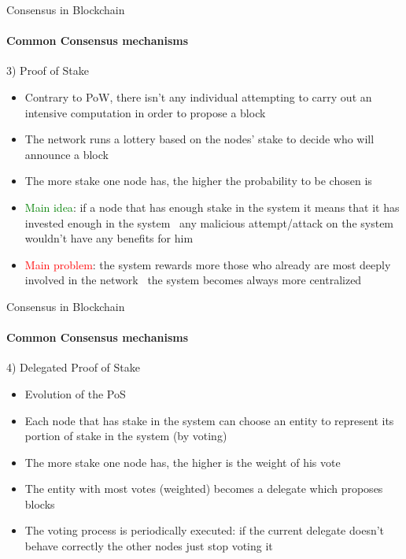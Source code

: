 \documentclass{beamer}
\newcommand\red[1]{\textcolor{red}{#1}}
\begin{document}
  \begin{frame}{Consensus in Blockchain}
    \framesubtitle{Common Consensus mechanisms}
    \begin{block}{3) Proof of Stake}
      \begin{itemize}
        \item Contrary to PoW, there isn't any individual attempting to carry out
        an intensive computation in order to propose a block 
        \item The network runs a lottery based on the nodes’ stake to decide
        who will announce a block 
        \item The more stake one node has, the higher the probability
        to be chosen is 
        \item \textcolor{green}{Main idea}: if a node that has enough stake in the system it means
        that it has invested enough in the system \MVRightarrow\, any malicious
        attempt/attack on the system wouldn't have any benefits for him \pause
        \item \red{Main problem}: the system rewards more those who already are most
        deeply involved in the network \MVRightarrow\, the system becomes always
        more centralized
      \end{itemize}
    \end{block}
  \end{frame}





  \begin{frame}{Consensus in Blockchain}
    \framesubtitle{Common Consensus mechanisms}
    \begin{block}{4) Delegated Proof of Stake}
      \begin{itemize}
        \item Evolution of the PoS 
        \item Each node that has stake in the system can choose an entity to
        represent its portion of stake in the system (by voting) 
        \item The more stake one node has, the higher is the weight of his vote 
        \item The entity with most votes (weighted) becomes a delegate which
        proposes blocks 
        \item The voting process is periodically executed: if the current delegate
        doesn't behave correctly the other nodes just stop voting it
      \end{itemize}
    \end{block}
  \end{frame}
\end{document}
